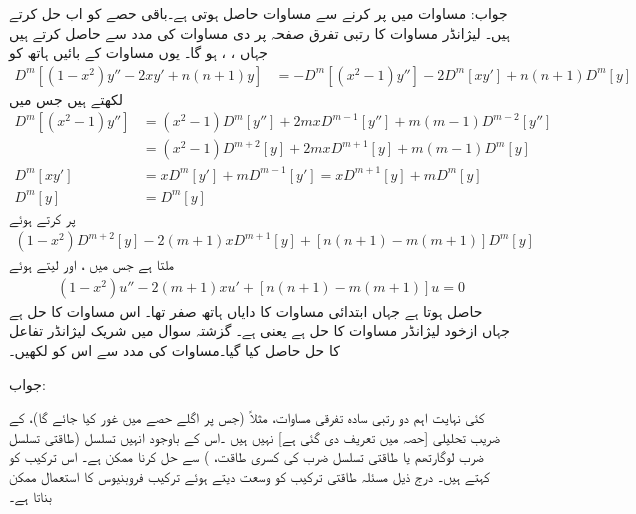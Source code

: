جواب: مساوات  میں  پر کرنے سے  مساوات  حاصل ہوتی ہے۔باقی حصے کو اب حل کرتے ہیں۔
لیژانڈر مساوات  کا  رتبی تفرق صفحہ  پر دی مساوات  کی مدد سے حاصل کرتے ہیں جہاں ،  ،   ہو گا۔ یوں مساوات کے بائیں ہاتھ کو
\begin{align*}
D^m[(1-x^2)y''-2xy'+n(n+1)y]&=-D^m[(x^2-1)y'']-2D^m[xy']+n(n+1)D^m[y]
\end{align*}
لکھتے ہیں جس میں
\begin{align*}
D^m[(x^2-1)y'']&=(x^2-1)D^m[y'']+2mxD^{m-1}[y'']+m(m-1)D^{m-2}[y'']\\
&=(x^2-1)D^{m+2}[y]+2mxD^{m+1}[y]+m(m-1)D^m[y]\\
D^m[xy']&=xD^m[y']+mD^{m-1}[y']=xD^{m+1}[y]+mD^m[y]\\
D^m[y]&=D^m[y]
\end{align*}
پر کرتے ہوئے 
\begin{align*}
(1-x^2)D^{m+2}[y]-2(m+1)xD^{m+1}[y]+[n(n+1)-m(m+1)]D^m[y]
\end{align*}
ملتا ہے جس میں ،  اور  لیتے ہوئے  
\begin{align*}
(1-x^2)u''-2(m+1)xu'+[n(n+1)-m(m+1)]u=0
\end{align*}
حاصل ہوتا ہے جہاں ابتدائی مساوات کا دایاں ہاتھ صفر تھا۔ اس مساوات کا حل  ہے جہاں  ازخود لیژانڈر مساوات کا حل ہے یعنی  ہے۔ 
گزشتہ سوال میں شریک لیژانڈر تفاعل کا حل  حاصل کیا گیا۔مساوات  کی مدد سے اس کو لکھیں۔ 

جواب:

کئی نہایت اہم دو رتبی سادہ تفرقی مساوات، مثلاً  (جس پر اگلے حصے میں غور کیا جائے گا)، کے  ضریب  تحلیلی [حصہ  میں تعریف دی گئی ہے] نہیں ہیں ۔اس کے باوجود انہیں تسلسل (طاقتی تسلسل ضرب لوگارتھم یا طاقتی تسلسل ضرب  کی کسری طاقت، ) سے حل کرنا ممکن ہے۔ اس ترکیب کو  کہتے ہیں۔ درج ذیل مسئلہ طاقتی ترکیب کو وسعت دیتے ہوئے ترکیب فروبنیوس کا استعمال ممکن بناتا ہے۔

